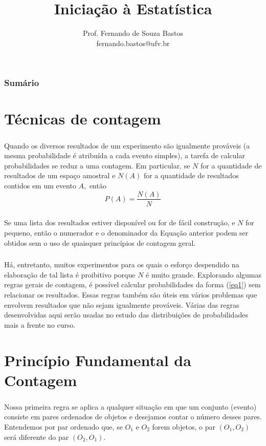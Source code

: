 \documentclass[14pt,aspectratio=1610]{beamer}
\title{Iniciação à Estatística}
\author{Prof. Fernando de Souza Bastos \texorpdfstring{\\ fernando.bastos@ufv.br}{}}
\institute{Departamento de Estatística \texorpdfstring{\\ Universidade Federal de Viçosa}{}\texorpdfstring{\\ Campus UFV - Viçosa}{}}
\date{}
\begin{document}
%

\frame{\titlepage}

\begin{frame}{}
\frametitle{\bf Sumário}
\tableofcontents
\end{frame}

\section{Técnicas de contagem}
\begin{frame}{}
\frametitle{}
\begin{block}{}
\justifying
Quando os diversos resultados de um experimento são igualmente prováveis (a mesma probabilidade é atribuída a cada evento simples), a tarefa de calcular probabilidades se reduz a uma contagem. Em particular, se $N$ for a quantidade de resultados de um espaço amostral e $N(A)$ for a quantidade de resultados contidos em um evento $A,$ então 
\begin{equation}\label{eq1}
P(A)=\dfrac{N(A)}{N}
\end{equation}
\end{block}
\end{frame}

\begin{frame}{}
\frametitle{}
\begin{block}{}
\justifying
Se uma lista dos resultados estiver disponível ou for de fácil construção, e $N$ for pequeno, então o numerador e o denominador da Equação anterior podem ser obtidos sem o uso de quaisquer princípios de contagem geral.
\end{block}
\end{frame}

\begin{frame}{}
\frametitle{}
\begin{block}{}
\justifying
Há, entretanto, muitos experimentos para os quais o esforço despendido na elaboração de tal lista é proibitivo porque $N$ é muito grande. Explorando algumas regras gerais de contagem, é possível calcular probabilidades da forma (\ref{eq1}) sem relacionar os resultados. Essas regras também são úteis em vários problemas que envolvem resultados que não sejam igualmente prováveis. Várias das regras desenvolvidas aqui serão usadas
no estudo das distribuições de probabilidades mais a frente no curso.
\end{block}
\end{frame}

\section{Princípio Fundamental da Contagem}
\begin{frame}{}
\frametitle{}
\begin{block}{}
\justifying
Nossa primeira regra se aplica a qualquer situação em que um conjunto (evento) consiste em pares ordenados de objetos e desejamos contar o número desses pares. Entendemos por par ordenado que, se $O_{1}$ e $O_{2}$ forem objetos, o par $(O_1, O_2)$ será diferente do par $(O_2, O_1).$
\end{block}
\end{frame}
\end{document}
